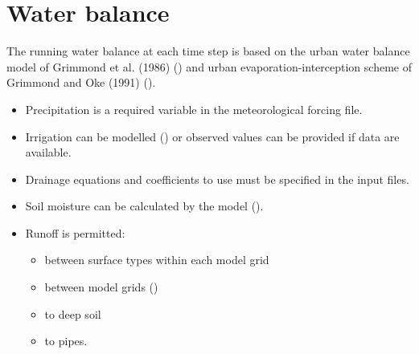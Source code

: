 \documentclass[letterpaper,10pt,english]{sphinxmanual}
\begin{document}
\section{Water balance}
\label{\detokenize{parameterisations-and-sub-models:water-balance}}
The running water balance at each time step is based on the urban water
balance model of Grimmond et al. (1986) \label{\detokenize{parameterisations-and-sub-models:id16}}{\hyperref[\detokenize{references:g86}]{\sphinxcrossref{{[}G86{]}}}} () and urban
evaporation-interception scheme of Grimmond and Oke (1991) \label{\detokenize{parameterisations-and-sub-models:id17}}{\hyperref[\detokenize{references:g91}]{\sphinxcrossref{{[}G91{]}}}} ().
\begin{itemize}
\item {} 
Precipitation is a required variable in the meteorological forcing
file.

\item {} 
Irrigation can be modelled \label{\detokenize{parameterisations-and-sub-models:id18}}{\hyperref[\detokenize{references:j11}]{\sphinxcrossref{{[}J11{]}}}} () or observed values can be provided
if data are available.

\item {} 
Drainage equations and coefficients to use must be specified in the
input files.

\item {} 
Soil moisture can be calculated by the model ().

\item {} 
Runoff is permitted:
\begin{itemize}
\item {} 
between surface types within each model grid

\item {} 
between model grids ()

\item {} 
to deep soil

\item {} 
to pipes.

\end{itemize}

\end{itemize}
\end{document}
